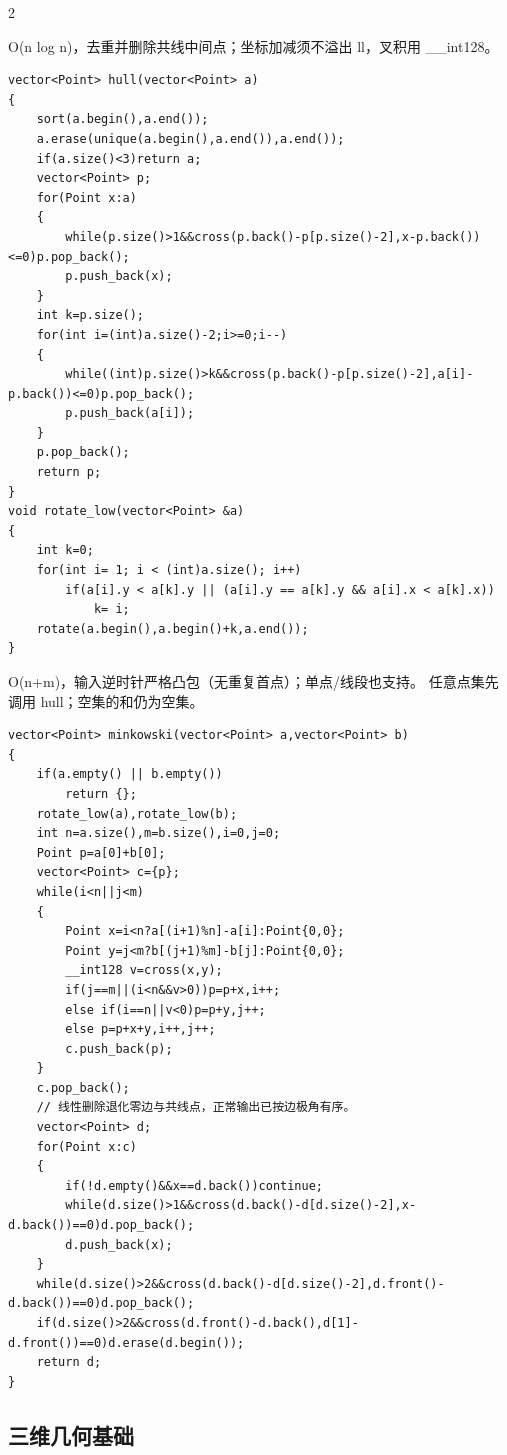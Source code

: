 \documentclass[UTF8,fontset=fandol,a4paper,twoside]{ctexart}
\newcommand{\note}[1]{{\fontsize{10}{12}\selectfont #1\par}}
\begin{document}
\begin{multicols}{2}
\note{O(\allowbreak{}n log n)\allowbreak{}，去重并删除共线中间点；坐标加减须不溢出 ll，叉积用 \_\_int128。}
\begin{lstlisting}
vector<Point> hull(vector<Point> a)
{
    sort(a.begin(),a.end());
    a.erase(unique(a.begin(),a.end()),a.end());
    if(a.size()<3)return a;
    vector<Point> p;
    for(Point x:a)
    {
        while(p.size()>1&&cross(p.back()-p[p.size()-2],x-p.back())<=0)p.pop_back();
        p.push_back(x);
    }
    int k=p.size();
    for(int i=(int)a.size()-2;i>=0;i--)
    {
        while((int)p.size()>k&&cross(p.back()-p[p.size()-2],a[i]-p.back())<=0)p.pop_back();
        p.push_back(a[i]);
    }
    p.pop_back();
    return p;
}
void rotate_low(vector<Point> &a)
{
    int k=0;
    for(int i= 1; i < (int)a.size(); i++)
        if(a[i].y < a[k].y || (a[i].y == a[k].y && a[i].x < a[k].x))
            k= i;
    rotate(a.begin(),a.begin()+k,a.end());
}
\end{lstlisting}
\note{O(\allowbreak{}n+\allowbreak{}m)\allowbreak{}，输入逆时针严格凸包（无重复首点）；单点/\allowbreak{}线段也支持。 任意点集先调用 hull；空集的和仍为空集。}
\begin{lstlisting}
vector<Point> minkowski(vector<Point> a,vector<Point> b)
{
    if(a.empty() || b.empty())
        return {};
    rotate_low(a),rotate_low(b);
    int n=a.size(),m=b.size(),i=0,j=0;
    Point p=a[0]+b[0];
    vector<Point> c={p};
    while(i<n||j<m)
    {
        Point x=i<n?a[(i+1)%n]-a[i]:Point{0,0};
        Point y=j<m?b[(j+1)%m]-b[j]:Point{0,0};
        __int128 v=cross(x,y);
        if(j==m||(i<n&&v>0))p=p+x,i++;
        else if(i==n||v<0)p=p+y,j++;
        else p=p+x+y,i++,j++;
        c.push_back(p);
    }
    c.pop_back();
    // 线性删除退化零边与共线点，正常输出已按边极角有序。
    vector<Point> d;
    for(Point x:c)
    {
        if(!d.empty()&&x==d.back())continue;
        while(d.size()>1&&cross(d.back()-d[d.size()-2],x-d.back())==0)d.pop_back();
        d.push_back(x);
    }
    while(d.size()>2&&cross(d.back()-d[d.size()-2],d.front()-d.back())==0)d.pop_back();
    if(d.size()>2&&cross(d.front()-d.back(),d[1]-d.front())==0)d.erase(d.begin());
    return d;
}
\end{lstlisting}
\subsection{三维几何基础}


\end{multicols}
\end{document}
